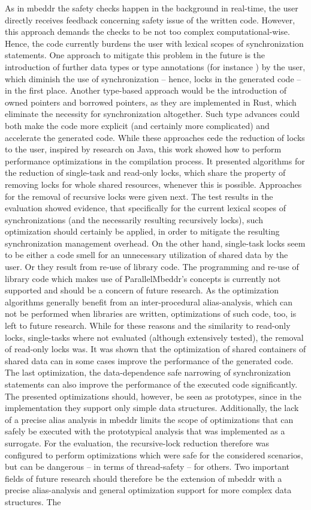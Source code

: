 As in mbeddr the safety checks happen in the background in real-time, the user directly receives feedback concerning safety issue of the written code. However, this approach demands the checks to be not too complex computational-wise. Hence, the code currently burdens the user with lexical scopes of synchronization statements. One approach to mitigate this problem in the future is the introduction of further data types or type annotations (for instance ) by the user, which diminish the use of synchronization -- hence, locks in the generated code -- in the first place. Another type-based approach would be the introduction of owned pointers and borrowed pointers, as they are implemented in Rust, which eliminate the necessity for synchronization altogether. Such type advances could both make the code more explicit (and certainly more complicated) and accelerate the generated code. While these approaches cede the reduction of locks to the user, inspired by research on Java, this work showed how to perform performance optimizations in the compilation process. It presented algorithms for the reduction of single-task and read-only locks, which share the property of removing locks for whole shared resources, whenever this is possible. Approaches for the removal of recursive locks were given next. The test results in the evaluation showed evidence, that specifically for the current lexical scopes of synchronizations (and the necessarily resulting recursively locks), such optimization should certainly be applied, in order to mitigate the resulting synchronization management overhead. On the other hand, single-task locks seem to be either a code smell for an unnecessary utilization of shared data by the user. Or they result from re-use of library code. The programming and re-use of library code which makes use of ParallelMbeddr's concepts is currently not supported and should be a concern of future research. As the optimization algorithms generally benefit from an inter-procedural alias-analysis, which can not be performed when libraries are written, optimizations of such code, too, is left to future research. While for these reasons and the similarity to read-only locks, single-tasks where not evaluated (although extensively tested), the removal of read-only locks was. It was shown that the optimization of shared containers of shared data can in some cases improve the performance of the generated code. The last optimization, the data-dependence safe narrowing of synchronization statements can also improve the performance of the executed code significantly. The presented optimizations should, however, be seen as prototypes, since in the implementation they support only simple data structures. Additionally, the lack of a precise alias analysis in mbeddr limits the scope of optimizations that can safely be executed with the prototypical analysis that was implemented as a surrogate. For the evaluation, the recursive-lock reduction therefore was configured to perform optimizations which were safe for the considered scenarios, but can be dangerous -- in terms of thread-safety -- for others. Two important fields of future research should therefore be the extension of mbeddr with a precise alias-analysis and general optimization support for more complex data structures. The 